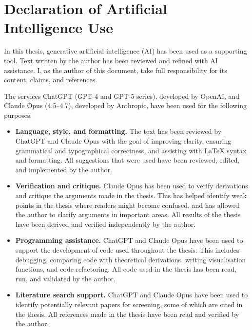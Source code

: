 
\chapter*{Declaration of Artificial Intelligence Use}

In this thesis, generative artificial intelligence (AI) has been used as a supporting tool. Text written by the author has been reviewed and refined with AI assistance. I, as the author of this document, take full responsibility for its content, claims, and references.

The services ChatGPT (GPT-4 and GPT-5 series), developed by OpenAI, and Claude Opus (4.5--4.7), developed by Anthropic, have been used for the following purposes:
\begin{itemize}
    \item \textbf{Language, style, and formatting.} The text has been reviewed by ChatGPT and Claude Opus with the goal of improving clarity, ensuring grammatical and typographical correctness, and assisting with \LaTeX{} syntax and formatting. All suggestions that were used have been reviewed, edited, and implemented by the author.
    \item \textbf{Verification and critique.} Claude Opus has been used to verify derivations and critique the arguments made in the thesis. This has helped identify weak points in the thesis where readers might become confused, and has allowed the author to clarify arguments in important areas. All results of the thesis have been derived and verified independently by the author.
    \item \textbf{Programming assistance.} ChatGPT and Claude Opus have been used to support the development of code used throughout the thesis. This includes debugging, comparing code with theoretical derivations, writing visualisation functions, and code refactoring. All code used in the thesis has been read, run, and validated by the author.
    \item \textbf{Literature search support.} ChatGPT and Claude Opus have been used to identify potentially relevant papers for screening, some of which are cited in the thesis. All references made in the thesis have been read and verified by the author.
\end{itemize}
